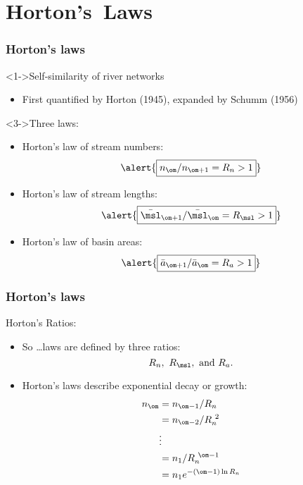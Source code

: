 \section{Horton's\ Laws}

\begin{frame}[label=]
  \frametitle{Horton's laws}

  \begin{block}<1->{Self-similarity of river networks}
    \begin{itemize}
    \item<2->
      First quantified by Horton (1945)\cite{horton1945a}, 
      expanded by Schumm (1956)\cite{schumm1956a}
    \end{itemize}
  \end{block}

  \begin{block}<3->{Three laws:}
    \begin{itemize}
    \item<4-> Horton's law of stream numbers:
      $$
      \alert{\boxed{n_{\om}/n_{\om+1} = R_n > 1 }}
      $$
    \item<5-> 
      Horton's law of stream lengths:
      $$
      \alert{\boxed{\bar{\msl}_{\om+1}/\bar{\msl}_{\om} = R_\msl > 1}}
      $$
    \item<6-> 
      Horton's law of basin areas:
      $$
      \alert{\boxed{\bar{a}_{\om+1}/\bar{a}_{\om} = R_a > 1}}
      $$
    \end{itemize}
  \end{block}
\end{frame}

\begin{frame}[label=]
  \frametitle{Horton's laws}

  \begin{block}{Horton's Ratios:}
    \begin{itemize}
    \item<1-> So \ldots laws are defined by three ratios: 
      $$R_n, \ R_\msl, \ \mbox{and} \ R_a.$$
    \item<2-> Horton's laws describe \alert{exponential decay or growth}:
      \begin{align*}
        n_\om & = n_{\om-1}/R_n \\
        & = n_{\om-2}/R_n^{\ 2} \\
        & \vdots \\
        & = n_{1}/R_n^{\ \om-1} \\
        & = n_{1} e^{-(\om-1) \ln{R_n}} \\
      \end{align*}
    \end{itemize}
  \end{block}

\end{frame}

